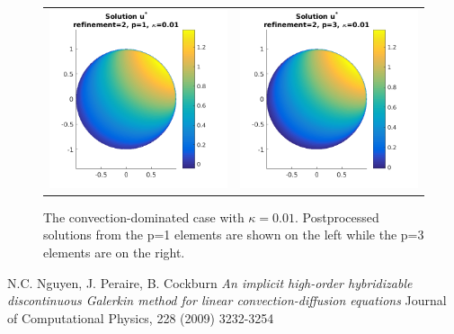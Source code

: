 \documentclass{article}
\begin{document}
\begin{figure}[!ht]
\begin{tabular}{c c}
\includegraphics[scale=0.7]{umustar_133.png} &
\includegraphics[scale=0.7]{umustar_233.png}
\end{tabular}
\caption{The convection-dominated case with $\kappa = 0.01$. Postprocessed solutions from the p=1 elements are shown on the left while the p=3 elements are on the right.}
\label{fig:ustar100}
\end{figure}
\begin{thebibliography}{9}
N.C. Nguyen, J. Peraire, B. Cockburn
\textit{An implicit high-order hybridizable discontinuous Galerkin method for linear convection-diffusion equations}
Journal of Computational Physics, 228 (2009) 3232-3254
\end{thebibliography}
\end{document}
